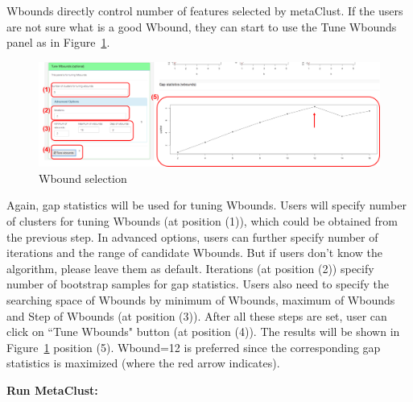 \begin{steps}
Wbounds directly control number of features selected by metaClust.
If the users are not sure what is a good Wbound,
they can start to use the Tune Wbounds panel as in Figure~\ref{fig:metaClusttuneW}.
\begin{figure}[H]
\begin{center}
\includegraphics[scale=0.5]{./figure/metaClust/tuneW.pdf}
\caption{Wbound selection}
\label{fig:metaClusttuneW}
\end{center}
\end{figure}
Again,
gap statistics will be used for tuning Wbounds.
Users will specify number of clusters for tuning Wbounds (at position {\color{red} (1)}), which could be obtained from the previous step.
In advanced options, users can further specify number of iterations and the range of candidate Wbounds.
But if users don't know the algorithm, please leave them as default.
Iterations (at position {\color{red} (2)}) specify number of bootstrap samples for gap statistics.
Users also need to specify the searching space of Wbounds by minimum of Wbounds, maximum of Wbounds and Step of Wbounds (at position {\color{red} (3)}).
After all these steps are set,
user can click on ``Tune Wbounds" button (at position {\color{red} (4)}).
The results will be shown in Figure~\ref{fig:metaClusttuneW}  position {\color{red} (5)}.
Wbound=12 is preferred since the corresponding gap statistics is maximized (where the red arrow indicates).

\item \textbf{Run MetaClust:} 


\end{steps}

